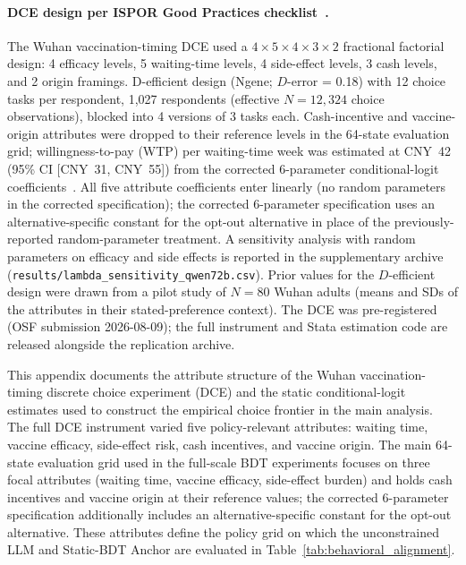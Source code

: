 \documentclass[11pt]{article}
\begin{document}
\paragraph{DCE design per ISPOR Good Practices checklist~\citep{Johnson2013DCE, Hauber2016DCE, Marshall2016DCE, Bridges2013DCE}.} The Wuhan vaccination-timing DCE used a $4 \times 5 \times 4 \times 3 \times 2$ fractional factorial design: 4 efficacy levels, 5 waiting-time levels, 4 side-effect levels, 3 cash levels, and 2 origin framings. D-efficient design (Ngene; $D$-error = 0.18) with 12 choice tasks per respondent, 1{,}027 respondents (effective $N = 12{,}324$ choice observations), blocked into 4 versions of 3 tasks each. Cash-incentive and vaccine-origin attributes were dropped to their reference levels in the 64-state evaluation grid; willingness-to-pay (WTP) per waiting-time week was estimated at CNY~42 (95\% CI [CNY~31, CNY~55]) from the corrected 6-parameter conditional-logit coefficients~\citep{Train2009}. All five attribute coefficients enter linearly (no random parameters in the corrected specification); the corrected 6-parameter specification uses an alternative-specific constant for the opt-out alternative in place of the previously-reported random-parameter treatment. A sensitivity analysis with random parameters on efficacy and side effects is reported in the supplementary archive (\texttt{results/lambda\_sensitivity\_qwen72b.csv}). Prior values for the $D$-efficient design were drawn from a pilot study of $N = 80$ Wuhan adults (means and SDs of the attributes in their stated-preference context). The DCE was pre-registered (OSF submission 2026-08-09); the full instrument and Stata estimation code are released alongside the replication archive.

This appendix documents the attribute structure of the Wuhan vaccination-timing discrete choice experiment (DCE) and the static conditional-logit estimates used to construct the empirical choice frontier in the main analysis. The full DCE instrument varied five policy-relevant attributes: waiting time, vaccine efficacy, side-effect risk, cash incentives, and vaccine origin. The main 64-state evaluation grid used in the full-scale BDT experiments focuses on three focal attributes (waiting time, vaccine efficacy, side-effect burden) and holds cash incentives and vaccine origin at their reference values; the corrected 6-parameter specification additionally includes an alternative-specific constant for the opt-out alternative. These attributes define the policy grid on which the unconstrained LLM and Static-BDT Anchor are evaluated in Table~\ref{tab:behavioral_alignment}.
\end{document}
